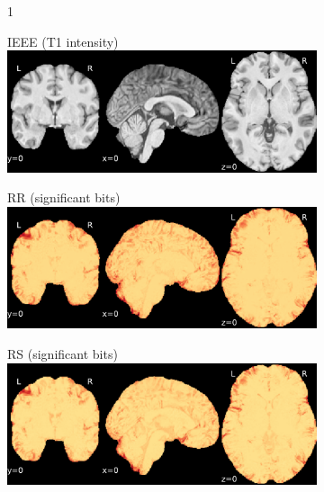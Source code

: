 \documentclass{article}
\begin{document}
\begin{appendices}
\begin{landscape}
\begin{figure}
            \vspace*{-2cm}
            \centering
            \begin{subfigure}[b][][c]{0.01\paperwidth} 1 \vspace*{-45pt} \end{subfigure}
            \begin{subfigure}[t]{0.2\paperheight}
                \centering
                IEEE (T1 intensity)
                \includegraphics[width=\textwidth]{figures/sig/0mm/ieee_ds001600_sub-1.pdf}
            \end{subfigure}
            \begin{subfigure}[t]{0.2\paperheight}
                \centering
                RR (significant bits)
                \includegraphics[width=\textwidth]{figures/sig/0mm/rr_ds001600_sub-1_sig.pdf}
            \end{subfigure}
            \begin{subfigure}[t]{0.2\paperheight}
                \centering
                RS (significant bits)
                \includegraphics[width=\textwidth]{figures/sig/0mm/rs_ds001600_sub-1_sig.pdf}

\end{subfigure}
\end{figure}
\end{landscape}
\end{appendices}
\end{document}
